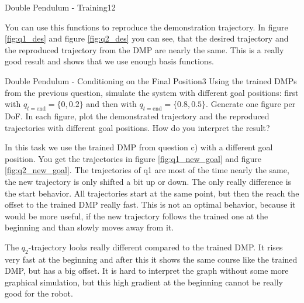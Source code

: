 \begin{questions}
\begin{question}{Double Pendulum - Training}{12}
\begin{answer}
You can use this functions to reproduce the demonstration trajectory. In figure \ref{fig:q1_des} and figure \ref{fig:q2_des} you can see, that the desired trajectory and the reproduced trajectory from the DMP are nearly the same. This is a really good result and shows that we use enough basis functions.

\end{answer}

\end{question}


\begin{question}{Double Pendulum - Conditioning on the Final Position}{3}
Using the trained DMPs from the previous question, simulate the system with different goal positions: first with $q_{t=\mathrm{end}} = \{0, 0.2\}$ and then with $q_{t=\mathrm{end}} = \{0.8, 0.5\}$. Generate one figure per DoF. In each figure, plot the demonstrated trajectory and the reproduced trajectories with different goal positions.
How do you interpret the result? 

\begin{answer}
In this task we use the trained DMP from question c) with a different goal position. You get the trajectories in figure \ref{fig:q1_new_goal} and figure \ref{fig:q2_new_goal}. The trajectories of q1 are most of the time nearly the same, the new trajectory is only shifted a bit up or down. The only really difference is the start behavior. All trajectories start at the same point, but then the reach the offset to the trained DMP really fast. This is not an optimal behavior, because it would be more useful, if the new trajectory follows the trained one at the beginning and than slowly moves away from it.

The $q_2$-trajectory looks really different compared to the trained DMP. It rises very fast at the beginning and after this it shows the same course like the trained DMP, but has a big offset. It is hard to interpret the graph without some more graphical simulation, but this high gradient at the beginning cannot be really good for the robot.


\end{answer}
\end{question}
\end{questions}
